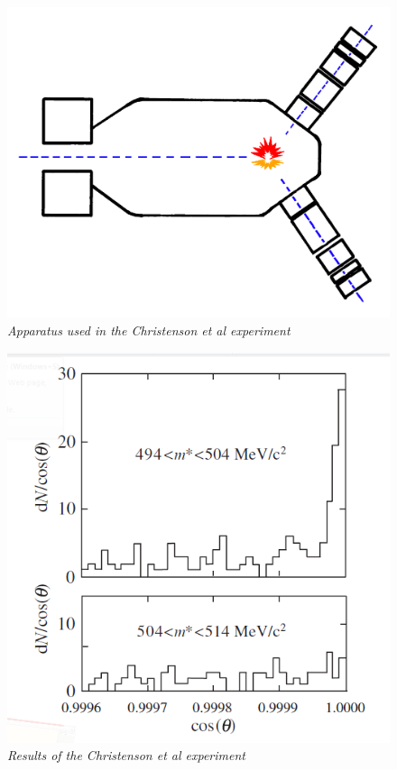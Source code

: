 \begin{figure}[h!]
\begin{center}
\includegraphics[scale=0.1]{figs/Christenson_apparatus.png}
\end{center}
\caption{\textit{Apparatus used in the Christenson et al experiment \cite{Christenson_apparatus_ref}}}
\label{Christenson_apparatus}
\end{figure}

\begin{figure}[h!]
\begin{center}
\includegraphics[scale=0.3]{figs/Christenson_results.png}
\end{center}
\caption{\textit{Results of the Christenson et al experiment \cite{FirstCPV}}}
\label{Christenson_results}
\end{figure}

